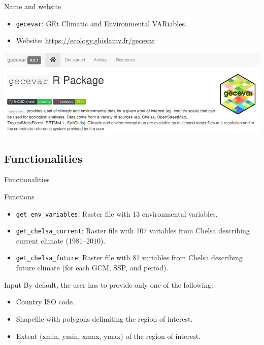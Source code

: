 \documentclass[10pt,table,dvipsnames,compress]{beamer}
\begin{document}
\begin{frame}[label={sec:org9f0043f},fragile]{Name and website}
 \begin{itemize}
\item \texttt{gecevar}: GEt Climatic and Environmental VARiables.
\item Website: \url{https://ecology.ghislainv.fr/gecevar}
\end{itemize}

\begin{center}
\includegraphics[width=\textwidth]{figs/gecevar-website.png}
\end{center}
\end{frame}

\subsection{Functionalities}
\label{sec:org47d0187}

\begin{frame}[label={sec:orgcd543c9},fragile]{Functionalities}
 \begin{block}{Functions}
\begin{itemize}
\item \texttt{get\_env\_variables}: Raster file with 13 environmental variables.
\item \texttt{get\_chelsa\_current}: Raster file with 107 variables from Chelsa describing current climate (1981--2010).
\item \texttt{get\_chelsa\_future}: Raster file with 81 variables from Chelsa describing future climate (for each GCM, SSP, and period).
\end{itemize}
\end{block}

\begin{block}{Input}
By default, the user has to provide only one of the following:
\begin{itemize}
\item Country ISO code.
\item Shapefile with polygons delimiting the region of interest.
\item Extent (xmin, ymin, xmax, ymax) of the region of interest.
\end{itemize}
\end{block}
\end{frame}
\end{document}

